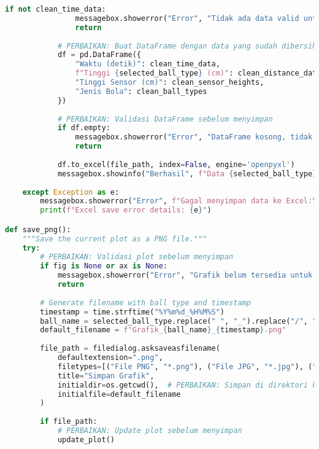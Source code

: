 \begin{itemize}
\begin{scriptsize}
\begin{lstlisting}[language=python]
            if not clean_time_data:
                messagebox.showerror("Error", "Tidak ada data valid untuk disimpan.")
                return
            
            # PERBAIKAN: Buat DataFrame dengan data yang sudah dibersihkan
            df = pd.DataFrame({
                "Waktu (detik)": clean_time_data, 
                f"Tinggi {selected_ball_type} (cm)": clean_distance_data,
                "Tinggi Sensor (cm)": clean_sensor_heights,
                "Jenis Bola": clean_ball_types
            })
            
            # PERBAIKAN: Validasi DataFrame sebelum menyimpan
            if df.empty:
                messagebox.showerror("Error", "DataFrame kosong, tidak dapat menyimpan.")
                return
            
            df.to_excel(file_path, index=False, engine='openpyxl')
            messagebox.showinfo("Berhasil", f"Data {selected_ball_type} disimpan ke {file_path}\nTotal data valid: {len(clean_time_data)}")
            
    except Exception as e:
        messagebox.showerror("Error", f"Gagal menyimpan data ke Excel:\n{str(e)}\n\nPastikan file tidak sedang dibuka di aplikasi lain.")
        print(f"Excel save error details: {e}")

def save_png():
    """Save the current plot as a PNG file."""
    try:
        # PERBAIKAN: Validasi plot sebelum menyimpan
        if fig is None or ax is None:
            messagebox.showerror("Error", "Grafik belum tersedia untuk disimpan.")
            return
        
        # Generate filename with ball type and timestamp
        timestamp = time.strftime("%Y%m%d_%H%M%S")
        ball_name = selected_ball_type.replace(" ", "_").replace("/", "_")  # PERBAIKAN: Hapus karakter invalid
        default_filename = f"Grafik_{ball_name}_{timestamp}.png"
        
        file_path = filedialog.asksaveasfilename(
            defaultextension=".png", 
            filetypes=[("File PNG", "*.png"), ("File JPG", "*.jpg"), ("File PDF", "*.pdf")],  # PERBAIKAN: Tambah format lain
            title="Simpan Grafik",
            initialdir=os.getcwd(),  # PERBAIKAN: Simpan di direktori kerja saat ini
            initialfile=default_filename
        )
        
        if file_path:
            # PERBAIKAN: Update plot sebelum menyimpan
            update_plot()
            

\end{lstlisting}
\end{scriptsize}
\end{itemize}
